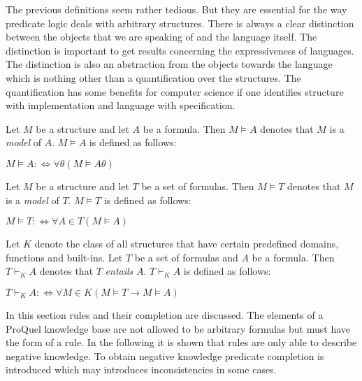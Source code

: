 The previous definitions seem rather tedious. But they are essential for the way predicate logic 
deals with arbitrary structures. There is always a clear distinction between the objects that we 
are speaking of and the language itself. The distinction is important to get results concerning 
the expressiveness of languages. The distinction is also an abstraction from the objects 
towards the language which is nothing other than a quantification over the structures. The 
quantification has some benefits for computer science if one identifies structure with 
implementation and language with specification.

\begin{Def} Let $M$ be a structure and let $A$ be a formula. Then $M \models A$ denotes
that $M$ is a {\em model} of $A$. $M \models A$ is  defined as follows:

\begin{center}
$M \models A :\Longleftrightarrow \forall \theta(M\models A\theta)$
\end{center}
\end{Def}

\begin{Def} Let $M$ be a structure and let $T$ be a set of formulas. Then $M \models T$ denotes
that $M$ is a {\em model} of $T$. $M \models T$ is defined as follows:

\begin{center}
$M \models T :\Longleftrightarrow \forall A \in T(M \models A)$
\end{center}
\end{Def}

\begin{Def} Let $K$ denote the class of all structures that have certain predefined domains,
functions and built-ins. Let $T$ be a set of formulas and $A$ be a formula. Then $T \vdash_K A$ 
denotes that $T$ {\em entails} $A$. $T \vdash_K A$ is defined as follows:

\begin{center}
$T \vdash_K A :\Longleftrightarrow \forall M \in K(M \models T \rightarrow M \models A)$
\end{center}
\end{Def}

\label{seccomp}
In this section rules and their completion are discussed. The elements of a ProQuel knowledge
base are not allowed to be arbitrary formulas but must have the form of a rule. In the following
it is shown that rules are only able to describe negative knowledge. To obtain negative knowledge
predicate completion is introduced which may introduces inconsistencies in some cases.

